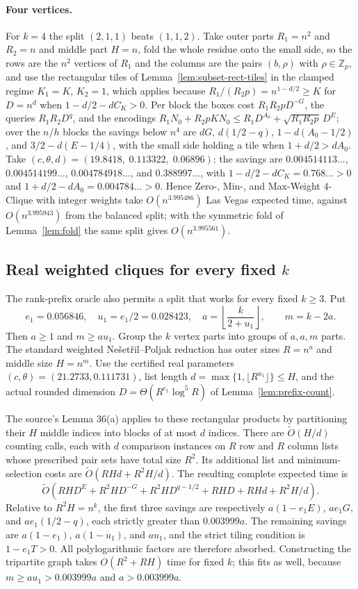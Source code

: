 \documentclass[11pt]{article}
\newcommand{\softO}{\widetilde O}
\begin{document}
\paragraph{Four vertices.}
For $k=4$ the split $(2,1,1)$ beats $(1,1,2)$. Take outer parts
$R_1=n^2$ and $R_2=n$ and middle part $H=n$, fold the whole residue onto
the small side, so the rows are the $n^2$ vertices of $R_1$ and the columns
are the pairs $(b,\rho)$ with $\rho\in\mathbb Z_p$, and use the rectangular
tiles of Lemma~\ref{lem:subset-rect-tiles} in the clamped regime
$K_1=K$, $K_2=1$, which applies because $R_1/(R_2p)=n^{1-d/2}\ge K$ for
$D=n^d$ when $1-d/2-dC_K>0$. Per block the boxes cost $R_1R_2pD^{-G}$,
the queries $R_1R_2D^q$, and the encodings
$R_1N_0+R_2pKN_0\le R_1D^{A_0}+\sqrt{R_1R_2p}\,D^E$; over the $n/h$
blocks the savings below $n^4$ are $dG$, $d(1/2-q)$, $1-d(A_0-1/2)$, and
$3/2-d(E-1/4)$, with the small side holding a tile when $1+d/2>dA_0$.
Take $(c,\theta,d)=(19.8418,\;0.113322,\;0.06896)$: the savings are
$0.004514113\ldots$, $0.004514199\ldots$, $0.004784918\ldots$, and
$0.388997\ldots$, with $1-d/2-dC_K=0.768\ldots>0$ and
$1+d/2-dA_0=0.004784\ldots>0$. Hence Zero-, Min-, and Max-Weight
$4$-Clique with integer weights take $O(n^{3.995486})$ Las Vegas expected
time, against $O(n^{3.995943})$ from the balanced split; with the symmetric
fold of Lemma~\ref{lem:fold} the same split gives $O(n^{3.995561})$.

\subsection*{Real weighted cliques for every fixed $k$}
The rank-prefix oracle also permits a split that works for every fixed
$k\ge3$. Put
\[
e_1=0.056846,\quad u_1=e_1/2=0.028423,\quad
a=\left\lfloor\frac{k}{2+u_1}\right\rfloor,\qquad m=k-2a.
\]
Then $a\ge1$ and $m\ge au_1$. Group the $k$ vertex parts into groups of
$a,a,m$ parts. The standard weighted Ne\v{s}et\v{r}il--Poljak reduction
has outer sizes $R=n^a$ and middle size $H=n^m$. Use the certified real
parameters $(c,\theta)=(21.2733,0.111731)$, list length
$d=\max\{1,\lfloor R^{u_1}\rfloor\}\le H$, and the actual rounded
dimension $D=\Theta(R^{e_1}\log^5 R)$ of
Lemma~\ref{lem:prefix-count}.

The source's Lemma 36(a) applies to these rectangular products by
partitioning their $H$ middle indices into blocks of at most $d$ indices.
There are $\softO(H/d)$ counting calls, each with $d$ comparison
instances on $R$ row and $R$ column lists whose prescribed pair sets
have total size $R^2$. Its additional list and minimum-selection costs
are $\softO(RHd+R^2H/d)$. The resulting complete expected time is
\[
\softO\left(RH D^E+R^2H D^{-G}+R^2H D^{q-1/2}
             +RH D+RHd+R^2H/d\right).
\]
Relative to $R^2H=n^k$, the first three savings are respectively
$a(1-e_1E)$, $ae_1G$, and $ae_1(1/2-q)$, each strictly greater than
$0.003999a$. The remaining savings are $a(1-e_1)$, $a(1-u_1)$,
and $au_1$, and the strict tiling condition is
$1-e_1T>0$. All polylogarithmic factors are therefore absorbed.
Constructing the tripartite graph takes $O(R^2+RH)$ time for fixed
$k$; this fits as well, because $m\ge au_1>0.003999a$ and
$a>0.003999a$.
\end{document}
